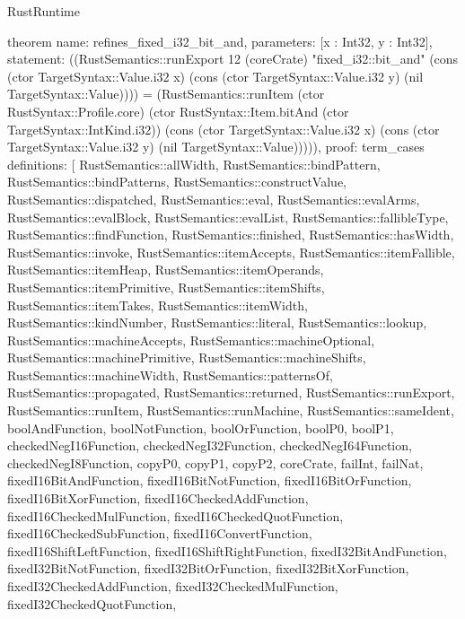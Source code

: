 \begin{lexlean}{RustRuntime}
\begin{semanticmodule}
theorem{
  name: refines_fixed_i32_bit_and,
  parameters: [x : Int32, y : Int32],
  statement: ((RustSemantics::runExport 12 (coreCrate) "fixed_i32::bit_and" (cons (ctor TargetSyntax::Value.i32 x) (cons (ctor TargetSyntax::Value.i32 y) (nil TargetSyntax::Value)))) = (RustSemantics::runItem (ctor RustSyntax::Profile.core) (ctor RustSyntax::Item.bitAnd (ctor TargetSyntax::IntKind.i32)) (cons (ctor TargetSyntax::Value.i32 x) (cons (ctor TargetSyntax::Value.i32 y) (nil TargetSyntax::Value))))),
  proof: term_cases{
    definitions: [
      RustSemantics::allWidth,
      RustSemantics::bindPattern,
      RustSemantics::bindPatterns,
      RustSemantics::constructValue,
      RustSemantics::dispatched,
      RustSemantics::eval,
      RustSemantics::evalArms,
      RustSemantics::evalBlock,
      RustSemantics::evalList,
      RustSemantics::fallibleType,
      RustSemantics::findFunction,
      RustSemantics::finished,
      RustSemantics::hasWidth,
      RustSemantics::invoke,
      RustSemantics::itemAccepts,
      RustSemantics::itemFallible,
      RustSemantics::itemHeap,
      RustSemantics::itemOperands,
      RustSemantics::itemPrimitive,
      RustSemantics::itemShifts,
      RustSemantics::itemTakes,
      RustSemantics::itemWidth,
      RustSemantics::kindNumber,
      RustSemantics::literal,
      RustSemantics::lookup,
      RustSemantics::machineAccepts,
      RustSemantics::machineOptional,
      RustSemantics::machinePrimitive,
      RustSemantics::machineShifts,
      RustSemantics::machineWidth,
      RustSemantics::patternsOf,
      RustSemantics::propagated,
      RustSemantics::returned,
      RustSemantics::runExport,
      RustSemantics::runItem,
      RustSemantics::runMachine,
      RustSemantics::sameIdent,
      boolAndFunction,
      boolNotFunction,
      boolOrFunction,
      boolP0,
      boolP1,
      checkedNegI16Function,
      checkedNegI32Function,
      checkedNegI64Function,
      checkedNegI8Function,
      copyP0,
      copyP1,
      copyP2,
      coreCrate,
      failInt,
      failNat,
      fixedI16BitAndFunction,
      fixedI16BitNotFunction,
      fixedI16BitOrFunction,
      fixedI16BitXorFunction,
      fixedI16CheckedAddFunction,
      fixedI16CheckedMulFunction,
      fixedI16CheckedQuotFunction,
      fixedI16CheckedSubFunction,
      fixedI16ConvertFunction,
      fixedI16ShiftLeftFunction,
      fixedI16ShiftRightFunction,
      fixedI32BitAndFunction,
      fixedI32BitNotFunction,
      fixedI32BitOrFunction,
      fixedI32BitXorFunction,
      fixedI32CheckedAddFunction,
      fixedI32CheckedMulFunction,
      fixedI32CheckedQuotFunction,
}}
\end{semanticmodule}
\end{lexlean}
